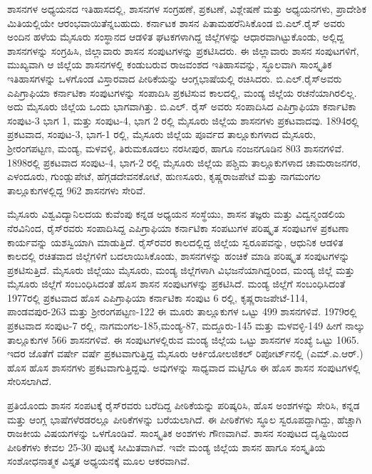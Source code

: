 ಶಾಸನಗಳ ಅಧ್ಯಯನದ ಇತಿಹಾಸದಲ್ಲಿ, ಶಾಸನಗಳ ಸಂಗ್ರಹಣೆ, ಪ್ರಕಟಣೆ, ವಿಶ್ಲೇಷಣೆ ಮತ್ತು ಅಧ್ಯಯನಗಳು, ಪ್ರಾದೇಶಿಕ ಮಿತಿಯಲ್ಲಿಯೇ ಆರಂಭವಾಯಿತೆನ್ನಬಹುದು. ಕರ್ನಾಟಕ ಶಾಸನ ಪಿತಾಮಹರೆನಿಸಿಕೊಂಡ ಬಿ.ಎಲ್​.ರೈಸ್​ ಅವರು ಅಂದಿನ ಹಳೆಯ ಮೈಸೂರು ಸಂಸ್ಥಾನದ ಆಡಳಿತ ಘಟಕಗಳಾಗಿದ್ದ ಜಿಲ್ಲೆಗಳನ್ನು ಆಧಾರವಾಗಿಟ್ಟುಕೊಂಡು, ಅಲ್ಲಿದ್ದ ಶಾಸನಗಳನ್ನು ಸಂಗ್ರಹಿಸಿ, ಜಿಲ್ಲಾವಾರು ಶಾಸನ ಸಂಪುಟಗಳನ್ನು ಪ್ರಕಟಿಸಿದರು. ಈ ಜಿಲ್ಲಾವಾರು ಶಾಸನ ಸಂಪುಟಗಳಿಗೆ, ಮುಖ್ಯವಾಗಿ ಆ ಜಿಲ್ಲೆಯ ಶಾಸನಗಳಲ್ಲಿ ಕಂಡುಬರುವ ರಾಜವಂಶದ ಇತಿಹಾಸವನ್ನು, ಸ್ಥೂಲವಾಗಿ ಸಾಂಸ್ಕೃತಿಕ ಇತಿಹಾಸಗಳನ್ನು ಒಳಗೊಂಡ ವಿಸ್ತಾರವಾದ ಪೀಠಿಕೆಯನ್ನು ಆಂಗ್ಲಭಾಷೆಯಲ್ಲಿ ರಚಿಸಿದರು. ಬಿ.ಎಲ್​.ರೈಸ್​ ಅವರು ಎಪಿಗ್ರಾಫಿಯಾ ಕರ್ನಾಟಿಕಾ ಸಂಪುಟಗಳನ್ನು ಸಂಪಾದಿಸಿ ಪ್ರಕಟಿಸುವ ಕಾಲದಲ್ಲಿ, ಮಂಡ್ಯ ಜಿಲ್ಲೆಯ ರಚನೆಯಾಗಿರಲಿಲ್ಲ. ಅದು ಮೈಸೂರು ಜಿಲ್ಲೆಯ ಒಂದು ಭಾಗವಾಗಿತ್ತು. ಬಿ.ಎಲ್​. ರೈಸ್​ ಅವರು ಸಂಪಾದಿಸಿದ ಎಪಿಗ್ರಾಫಿಯಾ ಕರ್ನಾಟಿಕಾ ಸಂಪುಟ-3 ಭಾಗ 1, ಮತ್ತು ಸಂಪುಟ-4, ಭಾಗ 2 ರಲ್ಲಿ ಮೈಸೂರು ಜಿಲ್ಲೆಯ ಶಾಸನಗಳು ಪ್ರಕಟವಾದವು. 1894ರಲ್ಲಿ ಪ್ರಕಟವಾದ, ಸಂಪುಟ-3, ಭಾಗ-1 ರಲ್ಲಿ, ಮೈಸೂರು ಜಿಲ್ಲೆಯ ಪೂರ್ವದ ತಾಲ್ಲೂಕುಗಳಾದ ಮೈಸೂರು, ಶ‍್ರೀರಂಗಪಟ್ಟಣ, ಮಂಡ್ಯ, ಮಳವಳ್ಳಿ, ತಿರುಮಕೂಡಲು ನರಸೀಪುರ, ಹಾಗೂ ನಂಜನಗೂಡಿನ 803 ಶಾಸನಗಳಿವೆ. 1898ರಲ್ಲಿ ಪ್ರಕಟವಾದ ಸಂಪುಟ-4, ಭಾಗ-2 ರಲ್ಲಿ ಮೈಸೂರು ಜಿಲ್ಲೆಯ ಪಶ್ಚಿಮ ತಾಲ್ಲೂಕುಗಳಾದ ಚಾಮರಾಜನಗರ, ಎಳಂದೂರು, ಗುಂಡ್ಲುಪೇಟೆ, ಹೆಗ್ಗಡದೇವನಕೋಟೆ, ಹುಣಸೂರು, ಕೃಷ್ಣರಾಜಪೇಟೆ ಮತ್ತು ನಾಗಮಂಗಲ ತಾಲ್ಲೂಕುಗಳಲ್ಲಿದ್ದ 962 ಶಾಸನಗಳು ಸೇರಿವೆ.

ಮೈಸೂರು ವಿಶ್ವವಿದ್ಯಾನಿಲದಯ ಕುವೆಂಪು ಕನ್ನಡ ಅಧ್ಯಯನ ಸಂಸ್ಥೆಯು, ಶಾಸನ ತಜ್ಞರು ಮತ್ತು ವಿದ್ವನ್ಮಂಡಲಿಯ ನೆರವಿನಿಂದ, ರೈಸ್​ರವರು ಸಂಪಾದಿಸಿದ್ದ ಎಪಿಗ್ರಾಫಿಯಾ ಕರ್ನಾಟಿಕಾ ಸಂಪಟುಗಳ ಪರಿಷ್ಕೃತ ಸಂಪುಟಗಳ ಪ್ರಕಟಣಾ ಕಾರ್ಯವನ್ನು ಯಶಸ್ವಿಯಾಗಿ ಮಾಡುತ್ತಿದೆ. ರೈಸ್​ರವರ ಕಾಲದಲ್ಲಿದ್ದ ಜಿಲ್ಲೆಯ ಸ್ವರೂಪವನ್ನು, ಆಧುನಿಕ ಆಡಳಿತ ಕಾಲದಲ್ಲಿ ರಚಿತವಾದ ಜಿಲ್ಲೆಗಳಿಗೆ ಬದಲಾಯಿಸಿಕೊಂಡು, ಶಾಸನಗಳನ್ನು ಹಂಚಿಕೆ ಮಾಡಿ ಪರಿಷ್ಕೃತ ಸಂಪುಟಗಳನ್ನು ಪ್ರಕಟಿಸುತ್ತಿದೆ. ಮೈಸೂರು ಜಿಲ್ಲೆಯು ಮೈಸೂರು, ಮಂಡ್ಯ ಜಿಲ್ಲೆಗಳಾಗಿ ವಿಭಜನೆಯಾಗಿದ್ದರಿಂದ, ಮಂಡ್ಯ ಜಿಲ್ಲೆ ಮತ್ತು ಮೈಸೂರು ಜಿಲ್ಲೆಗೆ ಸಂಬಂಧಿಸಿದಂತೆ ಹೊಸ ಶಾಸನ ಸಂಪುಟಗಳನ್ನು ಪ್ರಕಟಿಸಿದೆ. ಮಂಡ್ಯ ಜಿಲ್ಲೆಗೆ ಸಂಬಂಧಿಸಿದಂತೆ 1977ರಲ್ಲಿ ಪ್ರಕಟವಾದ ಹೊಸ ಎಪಿಗ್ರಾಫಿಯಾ ಕರ್ನಾಟಿಕಾ ಸಂಪುಟ 6 ರಲ್ಲಿ, ಕೃಷ್ಣರಾಜಪೇಟೆ-114, ಪಾಂಡವಪುರ-263 ಮತ್ತು ಶ‍್ರೀರಂಗಪಟ್ಟಣ-122 ಈ ಮೂರು ತಾಲ್ಲೂಕುಗಳ ಒಟ್ಟು 499 ಶಾಸನಗಳಿವೆ. 1979ರಲ್ಲಿ ಪ್ರಕಟವಾದ ಸಂಪುಟ-7 ರಲ್ಲಿ, ನಾಗಮಂಗಲ-185,\break ಮಂಡ್ಯ-87, ಮದ್ದೂರು-145 ಮತ್ತು ಮಳವಳ್ಳಿ-149 ಹೀಗೆ ನಾಲ್ಕು ತಾಲ್ಲೂಕುಗಳ 566 ಶಾಸನಗಳಿವೆ. ಈ ಸಂಪುಟಗಳಲ್ಲಿರುವ ಮಂಡ್ಯ ಜಿಲ್ಲೆಯ ಒಟ್ಟು ಶಾಸನಗಳ ಸಂಖ್ಯೆ ಒಟ್ಟು 1065. ಇದರ ಜೊತೆಗೆ ವರ್ಷೇ ವರ್ಷೆ ಪ್ರಕಟವಾಗುತ್ತಿದ್ದ ಮೈಸೂರು ಆರ್ಕಿಯೋಲಜಿಕಲ್​ ರಿಪೋರ್ಟ್‌ನಲ್ಲಿ (ಎಮ್.ಎ.ಆರ್​.) ಹೊಸ ಹೊಸ ಶಾಸನಗಳು ಪ್ರಕಟವಾಗುತ್ತಿದ್ದವು. ಅವುಗಳನ್ನು ಸಾಧ್ಯವಾದ ಮಟ್ಟಿಗೂ ಈ ಹೊಸ ಶಾಸನ ಸಂಪುಟಗಳಲ್ಲಿ ಸೇರಿಸಲಾಗಿದೆ.

ಪ್ರತಿಯೊಂದು ಶಾಸನ ಸಂಪಟಕ್ಕೆ ರೈಸ್​ರವರು ಬರೆದಿದ್ದ ಪೀಠಿಕೆಯನ್ನು ಪರಿಷ್ಕರಿಸಿ, ಹೊಸ ಅಂಶಗಳನ್ನು ಸೇರಿಸಿ, ಕನ್ನಡ ಮತ್ತು ಆಂಗ್ಲ ಭಾಷೆಗಳೆರಡರಲ್ಲೂ ಪೀಠಿಕೆಗಳನ್ನು ಬರೆಯಲಾಗಿದೆ. ಈ ಪೀಠಿಕೆಗಳು ಸ್ಥೂಲ ಸ್ವರೂಪದ್ದಾಗಿದ್ದು, ಹೆಚ್ಚಾಗಿ ರಾಜಕೀಯ ವಿಷಯಗಳನ್ನು ಒಳಗೊಂಡಿವೆ. ಸಾಂಸ್ಕೃತಿಕ ಅಂಶಗಳು ಗೌಣವಾಗಿವೆ. ಶಾಸನ ಸಂಪುಟದ ದೃಷ್ಟಿಯಿಂದ ಪೀಠಿಕೆಗಳು ಕೇವಲ 25-30 ಪುಟಕ್ಕೆ ಸೀಮಿತವಾಗಿವೆ. ಇವೇ ಮಂಡ್ಯ ಜಿಲ್ಲೆಯ ಶಾಸನ ಹಾಗೂ ಸಂಸ್ಕೃತಿಯ ಸಂಶೋಧನಾತ್ಮಕ ವಿಸ್ತೃತ ಅಧ್ಯಯನಕ್ಕೆ ಮೂಲ ಆಕರವಾಗಿವೆ.

